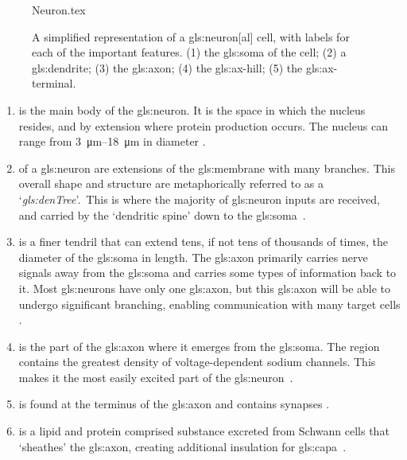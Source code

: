 \documentclass[class={myRUCProject}, crop=false]{standalone}
\begin{document}
\begin{figure}[H]
    \centering
    {Neuron.tex}
    \caption{A simplified representation of a \gls{gls:neuron}[al] cell, with labels for each of the important features. (1) the \gls{gls:soma} of the cell; (2) a \gls{gls:dendrite}; (3) the \gls{gls:axon}; (4) the \gls{gls:ax-hill}; (5) the \gls{gls:ax-terminal}.}\label{fig:Neuron}
\end{figure}

\begin{enumerate}
  \item {} is the main body of the \gls{gls:neuron}. It is the space in which the nucleus resides, and by extension where protein production occurs. The nucleus can range from \qtyrange{3}{18}{\um} in diameter \cite{}.
  \item {} of a \gls{gls:neuron} are extensions of the \gls{gls:membrane} with many branches. This overall shape and structure are metaphorically referred to as a `\textit{\gls{gls:denTree}}'.\footnotemark~This is where the majority of \gls{gls:neuron} inputs are received, and carried by the `dendritic spine' down to the \gls{gls:soma}~\cite{}. 
  \item {} is a finer tendril that can extend tens, if not tens of thousands of times, the diameter of the \gls{gls:soma} in length. The \gls{gls:axon} primarily carries nerve signals away from the \gls{gls:soma} and carries some types of information back to it. Most \glspl{gls:neuron} have only one \gls{gls:axon}, but this \gls{gls:axon} will be able to undergo significant branching, enabling communication with many target cells \cite{}. 
  \item {} is the part of the \gls{gls:axon} where it emerges from the \gls{gls:soma}. The region contains the greatest density of voltage-dependent sodium channels. This makes it the most easily excited part of the \gls{gls:neuron}~\cite{}. 
  \item {} is found at the terminus of the \gls{gls:axon} and contains synapses \cite{}. 
  \item {} is a lipid and protein comprised substance excreted from Schwann cells that `sheathes' the \gls{gls:axon}, creating additional insulation for \gls{gls:capa}~\cite{}.
\end{enumerate}
\end{document}

